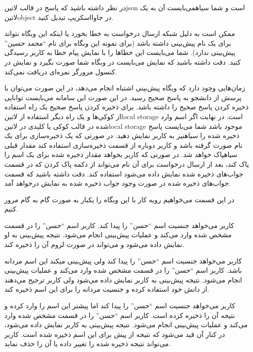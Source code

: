 \documentclass[../main.tex]{subfiles}
\begin{document}
در نظر داشته باشید که پاسخ در قالب ‌لاتین{json} است و شما ‌سیاه{می‌بایست} آن به یک ‌لاتین{object} در جاوااسکریپ تبدیل کنید.

ممکن است به دلیل شبکه ارسال درخواست به خطا بخورد یا اینکه این وبگاه نتواند برای یک نام پیش‌بینی داشته باشد (برای نمونه این وبگاه برای نام ``محمد حسین'' پیش‌بینی ندارد). شما می‌بایست این خطاها را با نمایش پیام خطا به کاربر رسیدگی کنید. دقت داشته باشید که نمایش می‌بایست در وبگاه شما صورت بگیرد و نمایش در کنسول مرورگر نمره‌ای دریافت نمی‌کند.

زمان‌هایی وجود دارد که وبگاه پیش‌بینی اشتباه انجام می‌دهد، در این صورت می‌توان با پرسش از دانشجو به پاسخ صحیح رسید. در این صورت این سامانه می‌بایست توانایی ذخیره کردن پاسخ صحیح را داشته باشد. برای ذخیره کردن پاسخ صحیح یک راه استفاده از کوکی‌ها و یک راه دیگر استفاده از ‌لاتین{local storage} است.
در نهایت اگر اسم وارد شده در قالب کوکی یا کلیدی در ‌لاتین{local storage} موجود باشد شما می‌بایست پاسخ ذخیره شده را ‌سیاه{نیز} به کاربر نمایش دهید.
در صورتی که یک ذخیره‌سازی برای یک نام صورت گرفته باشد و کاربر دوباره از قسمت ذخیره‌سازی استفاده کند مقدار قبلی ‌سیاه{پاک} خواهد شد.
در صورتی که کاربر بخواهد مقدار ذخیره شده برای یک اسم را پاک کند، بعد از ارسال درخواست برای آن نام می‌تواند از دکمه پاک کردن که در قسمت جواب‌های ذخیره شده نمایش داده می‌شود استفاده کند. دقت داشته باشید که قسمت جواب‌های ذخیره شده
در صورت وجود جواب ذخیره شده به نمایش درخواهد آمد.


در این قسمت می‌خواهیم رویه کار با این وبگاه را یکبار به صورت گام به گام مرور کنیم.

 کاربر می‌خواهد جنسیت اسم ``حسن'' را پیدا کند.
 کاربر اسم ``حسن'' را در قسمت مشخص شده وارد می‌کند و عملیات پیش‌بینی انجام می‌شود.
 نتیجه پیش‌بینی به او نمایش داده می‌شود و می‌تواند در صورت لزوم آن را ذخیره کند.

 کاربر می‌خواهد جنسیت اسم ``حسن'' را پیدا کند ولی پیش‌بینی میکند این اسم مردانه باشد.
 کاربر اسم ``حسن'' را در قسمت مشخص شده وارد می‌کند و عملیات پیش‌بینی انجام می‌شود.
 نتیجه پیش‌بینی به کاربر نمایش داده می‌شود ولی کاربر ترجیح می‌دهند از دانش خود استفاده کرده و جنسیت مردانه را برای این اسم ذخیره کند.

 کاربر می‌خواهد جنسیت اسم ``حسن'' را پیدا کند اما پیشتر این اسم را وارد کرده و نتیجه آن را ذخیره کرده است.
 کاربر اسم ``حسن'' را در قسمت مشخص شده وارد می‌کند و عملیات پیش‌بینی انجام می‌شود.
 نتیجه پیش‌بینی به کاربر نمایش داده می‌شود، در کنار آن قید می‌شود که نتیجه از پیش برای این اسم ذخیره شده است.
 کاربر می‌تواند نتیجه ذخیره شده را تغییر داده یا آن را حذف نماید.
\end{document}
